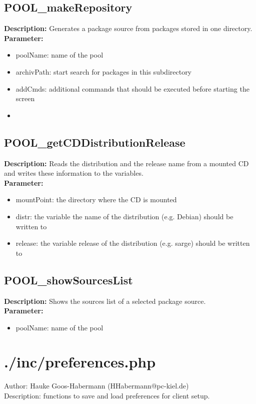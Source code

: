 \subsection{POOL\_makeRepository}
\textbf{Description:} Generates a package source from packages stored in one directory.\\
\textbf{Parameter:}
\begin{itemize}
\item poolName: name of the pool
\item archivPath: start search for packages in this subdirectory
\item addCmds: additional commands that should be executed before starting the screen
\item 
\end{itemize}

\subsection{POOL\_getCDDistributionRelease}
\textbf{Description:} Reads the distribution and the release name from a mounted CD and writes these information to the variables. \\
\textbf{Parameter:}
\begin{itemize}
\item mountPoint: the directory where the CD is mounted
\item distr: the variable the name of the distribution (e.g. Debian) should be written to
\item release: the variable release of the distribution (e.g. sarge) should be written to
\end{itemize}

\subsection{POOL\_showSourcesList}
\textbf{Description:} Shows the sources list of a selected package source.\\
\textbf{Parameter:}
\begin{itemize}
\item poolName: name of the pool
\end{itemize}

\newpage\section{./inc/preferences.php}
 Author: Hauke Goos-Habermann (HHabermann@pc-kiel.de)\\
 Description: functions to save and load preferences for client setup.\\

